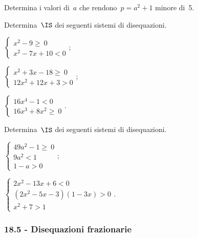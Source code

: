 \begin{esercizio}[\Ast]
 \label{ese:18.54}
 Determina i valori di~$a$ che rendono~$p=a^{2}+1$ minore di~5.
\end{esercizio}

\begin{esercizio}[\Ast]
 \label{ese:18.55}
 Determina~$\IS$ dei seguenti sistemi di disequazioni.
 \begin{multicols}{3}
 \begin{enumeratea}
 \item $\left\{\begin{array}{l}
		x^{2}-9\ge~0\\
		x^{2}-7x+10<0
	   \end{array}\right.;$
\item $\left\{\begin{array}{l}
		x^{2}+3x-18\ge~0\\
		12x^{2}+12x+3>0
	   \end{array}\right.;$
\item $\left\{\begin{array}{l}
		16x^{4}-1<0 \\
		16x^{3}+8x^{2}\ge~0 \end{array}\right.. $
 \end{enumeratea}
 \end{multicols}
\end{esercizio}

\begin{esercizio}[\Ast]
 \label{ese:18.56}
 Determina~$\IS$ dei seguenti sistemi di disequazioni.
 \begin{multicols}{2}
 \begin{enumeratea}
 \item $\left\{\begin{array}{l}
		49a^{2}-1\ge~0\\
		9a^{2}<1\\
		1-a>0
	   \end{array}\right.;$

\item $\left\{\begin{array}{l}
	  2x^{2}-13x+6<0\\
	  (2x^{2}-5x-3)(1-3x)>0\\
	  x^{2}+7>1
	   \end{array}\right..$
 \end{enumeratea}
 \end{multicols}
\end{esercizio}

\subsubsection*{18.5 - Disequazioni frazionarie}

